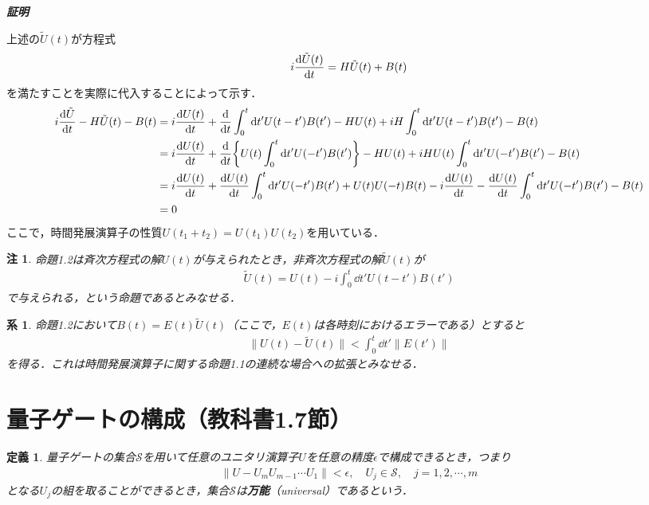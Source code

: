 \documentclass[dvipdfmx]{jarticle}
\makeatletter
\numberwithin{equation}{section}
\renewenvironment{proof}[1][\proofname]{\par
  \pushQED{\qed}
  \normalfont \topsep6\p@\@plus6\p@\relax
  \trivlist
  \item\relax
  {\itshape
  #1\@addpunct{ }}\hspace\labelsep\ignorespaces
}{
  \popQED\endtrivlist\@endpefalse
}
\theoremstyle{seminar}
\newtheorem{definition}{定義}[section]
\newtheorem{corollary}{系}[section]
\newtheorem{remark}{注}[section]
\renewcommand{\proofname}{\textbf{証明}}
\makeatother
\begin{document}
\begin{proof}
  上述の$\tilde{U}(t)$が方程式
  \begin{align}
    i\dv{\tilde{U}(t)}{t} = H\tilde{U}(t) + B(t)
  \end{align}
  を満たすことを実際に代入することによって示す．
  \begin{align}
    \begin{split}
      i\dv{\tilde{U}}{t} - H\tilde{U}(t) - B(t) &= i\dv{U(t)}{t} + \dv{t}\int_0^t \dd t' U(t - t') B(t') - HU(t) + iH\int_0^t \dd t' U(t - t')B(t') - B(t) \\
      &= i\dv{U(t)}{t} + \dv{t}\qty{U(t)\int_0^t \dd t' U(- t') B(t')} - HU(t) + iHU(t)\int_0^t \dd t' U(-t')B(t') - B(t) \\
      &= i\dv{U(t)}{t} + \dv{U(t)}{t} \int_0^t \dd t' U(-t')B(t') + U(t) U(-t)B(t) -i\dv{U(t)}{t} - \dv{U(t)}{t} \int_0^t \dd t' U(-t')B(t') - B(t) \\
      &= 0
    \end{split}
  \end{align}
  ここで，時間発展演算子の性質$U(t_1 + t_2) = U(t_1)U(t_2)$を用いている．
\end{proof}

\begin{remark}
  命題1.2は斉次方程式の解$U(t)$が与えられたとき，非斉次方程式の解$\tilde{U}(t)$が
  \begin{align}
    \tilde{U}(t) = U(t) - i\int_0^t \dd t' U(t - t')B(t')
  \end{align}
  で与えられる，という命題であるとみなせる．
\end{remark}

\begin{corollary}
  命題1.2において$B(t) = E(t)\tilde{U}(t)$（ここで，$E(t)$は各時刻におけるエラーである）とすると
  \begin{align}
    \| U(t) - \tilde{U}(t) \| < \int_0^t \dd t' \| E(t') \|
  \end{align}
  を得る．これは時間発展演算子に関する命題1.1の連続な場合への拡張とみなせる．
\end{corollary}
\section{量子ゲートの構成（教科書1.7節）}

\begin{definition}
  量子ゲートの集合$\mathcal{S}$を用いて任意のユニタリ演算子$U$を任意の精度$\epsilon$で構成できるとき，つまり
  \begin{align}
    \| U - U_m U_{m-1} \cdots U_1 \| < \epsilon, \quad U_j \in \mathcal{S}, \quad j = 1, 2, \cdots, m
  \end{align}
  となる$U_j$の組を取ることができるとき，集合$\mathcal{S}$は{\bf 万能}（universal）であるという．
\end{definition}
\end{document}
